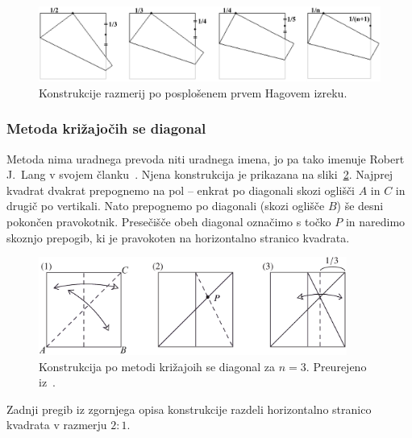 \begin{figure}[h]
    \centering
    \includegraphics[width=\textwidth]{images/razdelitev_daljice_h1.png}
    \caption[Razdelitev na enake dele (prvi Hagov izrek)]{Konstrukcije razmerij po posplošenem prvem Hagovem izreku.}
    \label{fig:razdelitev_daljice_h1}
\end{figure}

\subsubsection*{Metoda križajočih se diagonal}

Metoda nima uradnega prevoda niti uradnega imena, jo pa tako imenuje Robert J.\ Lang v svojem članku~\cite{lang1988}. Njena konstrukcija je prikazana na sliki~\ref{fig:kriz_diag_3}. Najprej kvadrat dvakrat prepognemo na pol -- enkrat po diagonali skozi oglišči $A$ in $C$ in drugič po vertikali. Nato prepognemo po diagonali (skozi oglišče $B$) še desni pokončen pravokotnik. Presečišče obeh diagonal označimo s točko $P$ in naredimo skoznjo prepogib, ki je pravokoten na horizontalno stranico kvadrata.

\begin{figure}[h]
    \centering
    \includegraphics[width=0.9\textwidth]{images/tretjinjenje_stranice1.png}
    \caption[Razdelitev stranice na tri dele]{Konstrukcija po metodi križajoih se diagonal za $n=3$. Preurejeno iz~\cite[str. 37]{hull2013}.}
    \label{fig:kriz_diag_3}
\end{figure}

\begin{trditev}
    \label{trd:kriz_diag_3}
    Zadnji pregib iz zgornjega opisa konstrukcije razdeli horizontalno stranico kvadrata v razmerju $2:1$.
\end{trditev}

